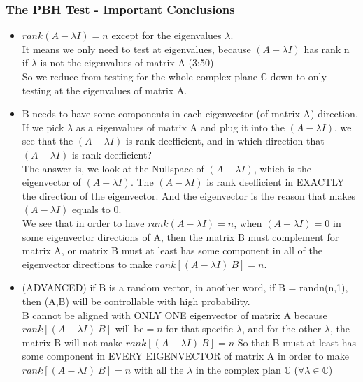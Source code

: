 \documentclass{article}
\begin{document}
	\subsubsection{The PBH Test - Important Conclusions}
		\begin{itemize}

		\item $rank(A - \lambda I) = n $ except for the eigenvalues $\lambda$.
				\\It means we only need to test at eigenvalues, 
				because $(A - \lambda I)$ has rank n if $\lambda$ is not the eigenvalues of matrix A (3:50)
				\\ So we reduce from testing for the whole complex plane $\mathbb{C}$ down to only testing
				at the eigenvalues of matrix A.
		\item B needs to have some components in each eigenvector (of matrix A) direction.
				\\If we pick $\lambda$ as a eigenvalues of matrix A and plug it into the $(A - \lambda I)$,
				we see that the $(A - \lambda I)$ is rank deefficient, and in which direction that
				$(A - \lambda I)$ is rank deefficient?
				\\The answer is, we look at the Nullspace of $(A - \lambda I)$, which is the eigenvector 
				of $(A - \lambda I)$. The $(A - \lambda I)$ is rank deefficient in EXACTLY the direction
				of the eigenvector. And the eigenvector is the reason that makes $(A - \lambda I)$ equals to 0.
				\\We see that in order to have $rank(A - \lambda I) = n $, when $(A - \lambda I) = 0$
				in some eigenvector directions of A, then the matrix B must complement for matrix A, or matrix B
				must at least has some component in all of the eigenvector directions to make $rank[(A - \lambda I) ~B] = n$.
		\item (ADVANCED) if B is a random vector, in another word, if B = randn(n,1), then (A,B) will be
				controllable with high probability.\\
				
				B cannot be aligned with ONLY ONE eigenvector of matrix A because $rank[(A - \lambda I) ~B]$ will be$ = n $
				for that specific $\lambda$, and for the other $\lambda$, the matrix B will not make $rank[(A - \lambda I) ~B] = n$
				So that B must at least has some component in EVERY EIGENVECTOR of matrix A in order to make 
				$rank[(A - \lambda I) ~B] = n$ with all the $\lambda$ in the complex plan $\mathbb{C}$ ($\forall \lambda \in \mathbb{C}$)\\
				

\end{itemize}
\end{document}

